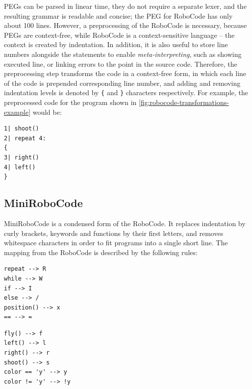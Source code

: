 PEGs can be parsed in linear time, they do not require a separate lexer,
and the resulting grammar is readable and concise;
the PEG for RoboCode %
has only about 100 lines. %
However, a preprocessing of the RoboCode is necessary, because
PEGs are context-free,
while RoboCode is a context-sensitive language
-- the context is created by indentation.
In addition, it is also useful to store line numbers alongside the statements
to enable \emph{meta-interpreting},
such as showing executed line, or linking errors to the point in the source code.
Therefore, the preprocessing step transforms the code in a context-free form,
in which each line of the code is prepended corresponding line number,
and adding and removing indentation levels is denoted by \texttt{\{}
and \texttt{\}} characters respectively.
For example, the preprocessed code for the program shown in
\cref{fig:robocode-transformations-example} would be:
\begin{lstlisting}
1| shoot()
2| repeat 4:
{
3| right()
4| left()
}
\end{lstlisting}

\subsection{MiniRoboCode}
\label{sec:minirobocode}

MiniRoboCode is a condensed form of the RoboCode.
It replaces indentation by curly brackets,
keywords and functions by their first letters,
and removes whitespace characters
in order to fit programs into a single short line.
The mapping from the RoboCode is described by the following rules:
\smallskip

\noindent\begin{minipage}{.49\textwidth}
\begin{lstlisting}[numbers=none]
repeat --> R
while --> W
if --> I
else --> /
position() --> x
== --> =
\end{lstlisting}
\end{minipage}\hfill
\begin{minipage}{.49\textwidth}
\begin{lstlisting}[numbers=none]
fly() --> f
left() --> l
right() --> r
shoot() --> s
color == 'y' --> y
color != 'y' --> !y
\end{lstlisting}
\end{minipage}

